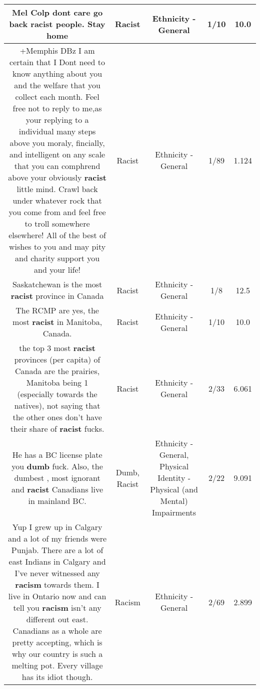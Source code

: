 \documentclass[11pt]{article}
\newlength\mylength
\begin{document}
\begin{center}
\begin{longtable}{|C{.65\mylength}|C{.30\mylength}|C{.12\mylength}|C{.12\mylength}|C{.12\mylength}|}
  \small Mel Colp dont care go back \textbf{racist} people. Stay home\normalsize   & Racist & Ethnicity - General & 1/10 & 10.0 \\  \hline
  \small +Memphis DBz I am certain that I Dont need to know anything about you and the welfare that you collect each month. Feel free not to reply to me,as your replying to a individual many steps above you moraly, fincially, and intelligent on any scale that you can comphrend above your obviously \textbf{racist} little mind. Crawl back under whatever rock that you come from and feel free to troll somewhere elsewhere! All of the best of wishes to you and may pity and charity support you and your life!\normalsize   & Racist & Ethnicity - General & 1/89 & 1.124 \\  \hline
  \small Saskatchewan is the most \textbf{racist} province in Canada\normalsize   & Racist & Ethnicity - General & 1/8 & 12.5 \\  \hline
  \small The RCMP are yes, the most \textbf{racist} in Manitoba, Canada.\normalsize   & Racist & Ethnicity - General & 1/10 & 10.0 \\  \hline
  \small the top 3 most \textbf{racist} provinces (per capita) of Canada are the prairies, Manitoba being 1 (especially towards the natives), not saying that the other ones don't have their share of \textbf{racist} fucks.\normalsize   & Racist & Ethnicity - General & 2/33 & 6.061 \\  \hline
  \small He has a BC license plate you \textbf{dumb} fuck. Also, the dumbest , most ignorant and \textbf{racist} Canadians live in mainland BC.\normalsize   & Dumb, Racist & Ethnicity - General, Physical Identity - Physical (and Mental) Impairments & 2/22 & 9.091 \\  \hline
  \small Yup I grew up in Calgary and a lot of my friends were Punjab. There are a lot of east Indians in Calgary and I've never witnessed any \textbf{racism} towards them. I live in Ontario now and can tell you \textbf{racism} isn't any different out east. Canadians as a whole are pretty accepting, which is why our country is such a melting pot. Every village has its idiot though.\normalsize   & Racism & Ethnicity - General & 2/69 & 2.899 \\  \hline

\end{longtable}
\end{center}
\end{document}
